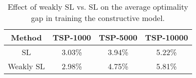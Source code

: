 \begin{table}
\caption{Effect of weakly SL vs. SL on the average optimality gap in training the constructive model.}
\label{Table: weakly SL vs. SL}
\centering
\begin{tabular}{c|ccc}%
\toprule%
Method&TSP-1000&TSP-5000&TSP-10000\\
\midrule%

SL &3.03\% &3.94\% &5.22\% \\

Weakly SL &2.98\% &4.75\% &5.81\% \\
\bottomrule%
\end{tabular}
\label{08Tab_WSL_vs_SL}
\end{table}